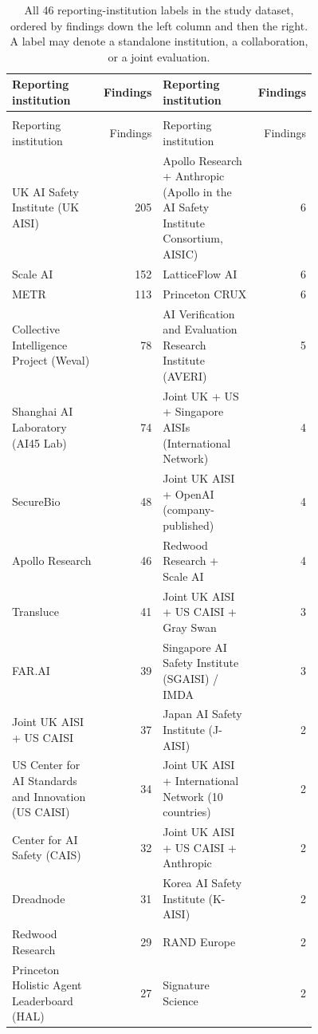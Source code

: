 \documentclass{article}
\begin{document}
\begingroup
\small
\setlength{\tabcolsep}{3pt}
\renewcommand{\arraystretch}{1.08}
\begin{longtable}{>{\raggedright\arraybackslash}p{0.38\linewidth} r >{\raggedright\arraybackslash}p{0.38\linewidth} r}
\caption{All 46 reporting-institution labels in the study dataset, ordered by findings down the left column and then the right. A label may denote a standalone institution, a collaboration, or a joint evaluation.}\label{tab:reporting-institutions}\\
\toprule
Reporting institution & Findings & Reporting institution & Findings \\
\midrule
\endfirsthead
\multicolumn{4}{r}{\small Table \thetable\ (continued)} \\
\toprule
Reporting institution & Findings & Reporting institution & Findings \\
\midrule
\endhead
UK AI Safety Institute (UK AISI) & 205 & Apollo Research + Anthropic (Apollo in the AI Safety Institute Consortium, AISIC) & 6 \\
Scale AI & 152 & LatticeFlow AI & 6 \\
METR & 113 & Princeton CRUX & 6 \\
Collective Intelligence Project (Weval) & 78 & AI Verification and Evaluation Research Institute (AVERI) & 5 \\
Shanghai AI Laboratory (AI45 Lab) & 74 & Joint UK + US + Singapore AISIs (International Network) & 4 \\
SecureBio & 48 & Joint UK AISI + OpenAI (company-published) & 4 \\
Apollo Research & 46 & Redwood Research + Scale AI & 4 \\
Transluce & 41 & Joint UK AISI + US CAISI + Gray Swan & 3 \\
FAR.AI & 39 & Singapore AI Safety Institute (SGAISI) / IMDA & 3 \\
Joint UK AISI + US CAISI & 37 & Japan AI Safety Institute (J-AISI) & 2 \\
US Center for AI Standards and Innovation (US CAISI) & 34 & Joint UK AISI + International Network (10 countries) & 2 \\
Center for AI Safety (CAIS) & 32 & Joint UK AISI + US CAISI + Anthropic & 2 \\
Dreadnode & 31 & Korea AI Safety Institute (K-AISI) & 2 \\
Redwood Research & 29 & RAND Europe & 2 \\
Princeton Holistic Agent Leaderboard (HAL) & 27 & Signature Science & 2 \\

\end{longtable}
\end{document}
